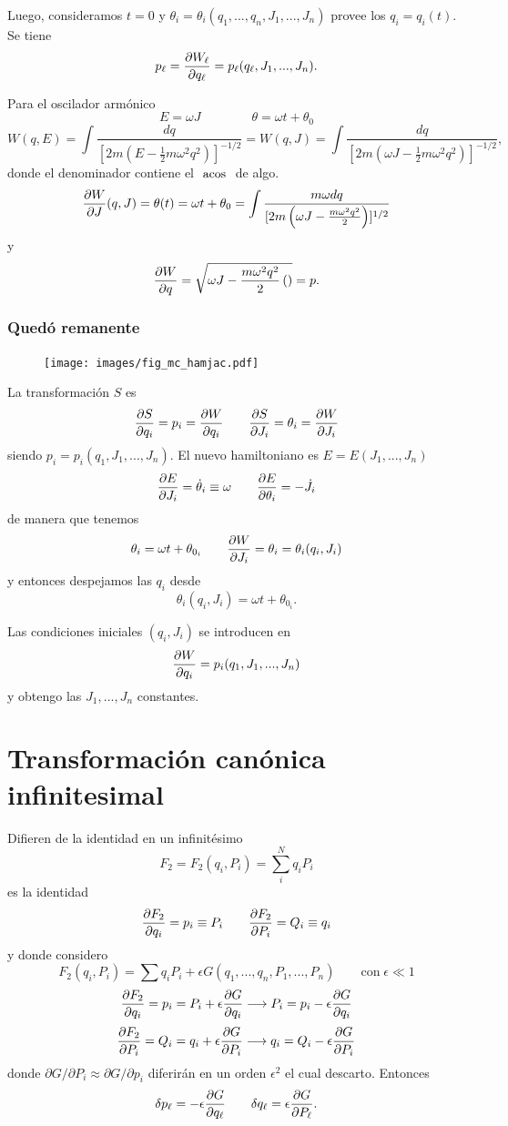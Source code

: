 \documentclass[10pt,oneside]{CBFT_book}
\begin{document}
Luego, consideramos $t=0$ y $\theta_i = \theta_i ( q_1,...,q_n,J_1,...,J_n)$ provee los $q_i = q_i(t)$. Se tiene 
\[
	p_\ell = \dpar{W_\ell}{q_\ell} = p_\ell( q_\ell, J_1, ..., J_n ).
\]

Para el oscilador armónico
\[
	E = \omega J \qquad \qquad \theta = \omega t + \theta_0
\]
\[
	W(q,E) = \int \frac{dq}{ [ 2 m \left( E - \frac{1}{2} m \omega^2 q^2 \right) ]^{-1/2} } = 
	W(q,J) = \int \frac{dq}{ [ 2 m \left( \omega J - \frac{1}{2} m \omega^2 q^2 \right) ]^{-1/2} },
\]
donde el denominador contiene el $\acos$ de algo.
\[
	\dpar{W}{J}(q,J) = \theta (t) = \omega t + \theta_0 = \int \frac{ m \omega dq }{ [ 2 m \left( \omega J - \frac{ m \omega^2 q^2 }{2} \right) ]^{1/2} }
\]
y
\[
	\dpar{W}{q} = \sqrt{ \omega J - \frac{ m \omega^2 q^2 }{2} \left( \right) } = p.
\]

\subsubsection{Quedó remanente}

\begin{figure}
	\begin{center}
	\texttt{[image: images/fig\_mc\_hamjac.pdf]}	 
	\end{center}
	\caption{}
\end{figure} 


La transformación $S$ es 
\[
	\dpar{S}{q_i} = p_i = \dpar{W}{q_i} \qquad \dpar{S}{J_i} = \theta_i = \dpar{W}{J_i}
\]
siendo $p_i = p_i(q_1,J_1,...,J_n)$.
El nuevo hamiltoniano es $E=E(J_1,...,J_n)$
\[
	\dpar{E}{J_i} = \dot{\theta}_i \equiv \omega \qquad \dpar{E}{\theta_i} = -\dot{J}_i
\]
de manera que tenemos
\[
	\theta_i = \omega t + \theta_{0_i} \qquad  \dpar{W}{J_i} = \theta_i = \theta_i(q_i, J_i)
\]
y entonces despejamos las $q_i$ desde
\[
	\theta_i(q_i, J_i) = \omega t + \theta_{0_i}.
\]

Las condiciones iniciales $(q_i, J_i)$ se introducen en
\[
	\dpar{W}{q_i} = p_i(q_1,J_1,...,J_n)
\]
y obtengo las $J_1, ..., J_n$ constantes.

\section{Transformación canónica infinitesimal}

Difieren de la identidad en un infinitésimo
\[
	F_2 = 	F_2(q_i,P_i) = \sum_i^N q_iP_i
\]
es la identidad
\[
	\dpar{F_2}{q_i} =  p_i \equiv P_i \qquad \dpar{F_2}{P_i} =  Q_i \equiv q_i
\]
y donde considero
\[
	F_2(q_i,P_i) = \sum q_i P_i + \epsilon G(q_1,...,q_n,P_1,...,P_n) \qquad \textrm{con} \; \epsilon \ll 1
\]
\[
	\dpar{F_2}{q_i} = p_i = P_i + \epsilon\dpar{G}{q_i} \longrightarrow P_i = p_i - \epsilon\dpar{G}{q_i} 
\]
\[
	\dpar{F_2}{P_i} = Q_i = q_i + \epsilon\dpar{G}{P_i} \longrightarrow q_i = Q_i - \epsilon\dpar{G}{P_i} 	
\]
donde $\partial G/\partial P_i \approx \partial G/\partial p_i$ diferirán en un orden $\epsilon^2$ el cual
descarto. Entonces
\[
	\delta p_\ell = -\epsilon \dpar{G}{q_\ell} \qquad \delta q_\ell = \epsilon \dpar{G}{P_\ell}.
\]
\end{document}
